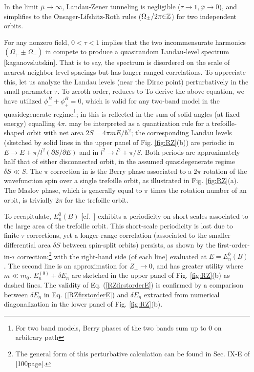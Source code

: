 \documentclass[aps, prb, showpacs, twocolumn, notitlepage, superscriptaddress]{revtex4-1}
\begin{document}
In the limit $\bar{\mu}{\rightarrow} \infty$, Landau-Zener tunneling is negligible ($\tau{\rightarrow}1,\bar{\varphi}{\rightarrow}0$), and  simplifies to the Onsager-Lifshitz-Roth rules ($\Omega_{\pm}/2\pi{\in}\mathbb{Z}$) for  two independent orbits.

For any nonzero field, $0{<}\tau{<}1$ implies that the two incommensurate harmonics $(\Omega_+{\pm}\Omega_-)$ in  compete to produce a quasirandom Landau-level spectrum [kaganovslutskin]. That is to say, the spectrum is disordered on the scale of nearest-neighbor level spacings but has longer-ranged correlations. To appreciate this, let us analyze the Landau levels (near the Dirac point) perturbatively in the small parameter $\tau$. To zeroth order,  reduces to
To derive the above equation, we have utilized $\phi^B_-{+}\phi^B_+{=}0$, which is valid for any two-band model in the quasidegenerate regime\footnote{For two band models, Berry phases of the two bands sum up to 0 on arbitrary path}; in  this is reflected in the sum of solid angles (at fixed energy) equalling $4\pi$.  may be interpreted as a quantization rule for a trefoille-shaped orbit with net area $2S{=}4\pi m E{/\hbar^2}$; the corresponding Landau levels (sketched by solid lines in the upper panel of Fig. \ref{fig:RZ}(b)) are periodic in $E{\rightarrow}E{+}\pi/l^2(\partial S/\partial E)$ and in $l^2{\rightarrow}l^2{+}\pi/S$. Both periods are approximately half that of either disconnected  orbit, in the assumed quasidegenerate regime $\delta S{\ll}S$. The $\pi$ correction in  is the Berry phase associated to a $2\pi$ rotation of the wavefunction spin over a single trefoille orbit, as illustrated in Fig. \ref{fig:RZ}(a). The Maslov phase, which is generally equal to $\pi$ times the rotation number of an orbit, is trivially $2\pi$ for the trefoille orbit.

To recapitulate, $E_n^0(B)$ [cf.\ ] exhibits a periodicity on short scales associated to the large area of the trefoille orbit. This short-scale periodicity is lost due to  finite-$\tau$ corrections, yet a longer-range correlation (associated to the smaller differential area $\delta S$ between spin-split orbits) persists, as shown by the first-order-in-$\tau$ correction:\footnote{The general form of this perturbative calculation can be found in Sec. IX-E of [100page].} 
with the right-hand side (of each line) evaluated at $E{=}E_n^0(B)$. The second line is an approximation for $Z_{\perp}{\rightarrow}0$, and has greater utility where $m{\ll}m_0$. $E_n^{(0)}+\delta E_n$ are sketched in the upper panel of Fig. \ref{fig:RZ}(b) as dashed lines. The validity of Eq. (\ref{RZfirstorderE}) is confirmed by a comparison between $\delta E_n$ in Eq. (\ref{RZfirstorderE}) and $\delta E_n$ extracted from numerical diagonalization in the lower panel of Fig. \ref{fig:RZ}(b).
\end{document}
